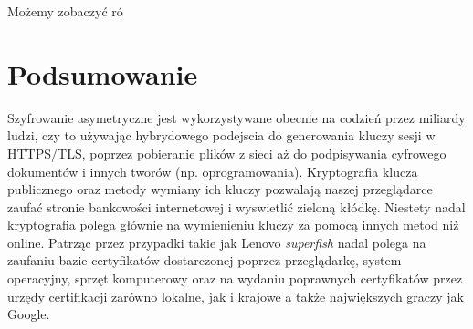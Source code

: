 \documentclass[11pt]{article}
\begin{document}
Możemy zobaczyć ró
\section{Podsumowanie}
\label{sec:org897e6af}

Szyfrowanie asymetryczne jest wykorzystywane obecnie na codzień przez miliardy ludzi, czy to używając hybrydowego podejscia do generowania kluczy sesji w HTTPS/TLS, poprzez pobieranie plików z sieci aż do podpisywania cyfrowego dokumentów i innych tworów (np. oprogramowania). Kryptografia klucza publicznego oraz metody wymiany ich kluczy pozwalają naszej przeglądarce zaufać stronie bankowości internetowej i wyswietlić zieloną kłódkę. Niestety nadal kryptografia polega głównie na wymienieniu kluczy za pomocą innych metod niż online. Patrząc przez przypadki takie jak Lenovo \emph{superfish} nadal polega na zaufaniu bazie certyfikatów dostarczonej poprzez przeglądarkę, system operacyjny, sprzęt komputerowy oraz na wydaniu poprawnych certyfikatów przez urzędy certifikacji zarówno lokalne, jak i krajowe a także największych graczy jak Google.
\end{document}

